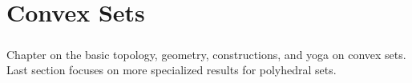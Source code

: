 \chapter{Convex Sets}
\label{chap:01}

\paragraph{}Chapter on the basic topology, geometry, constructions, and yoga on convex sets. Last section focuses on more specialized results for polyhedral sets.









